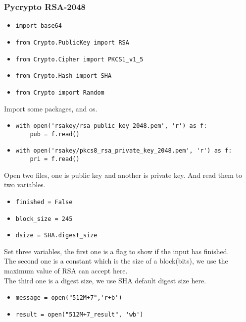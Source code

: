\documentclass{article}
\begin{document}
\subsubsection{Pycrypto RSA-2048}

\begin{itemize}
\item \verb|import base64|
\item \verb|from Crypto.PublicKey import RSA|
\item \verb|from Crypto.Cipher import PKCS1_v1_5|
\item \verb|from Crypto.Hash import SHA|
\item \verb|from Crypto import Random|
\end{itemize}

\noindent Import some packages, and os.

\begin{itemize}
\item \begin{verbatim}with open('rsakey/rsa_public_key_2048.pem', 'r') as f:
    pub = f.read()
\end{verbatim}
\item \begin{verbatim}with open('rsakey/pkcs8_rsa_private_key_2048.pem', 'r') as f:
    pri = f.read()
\end{verbatim}
\end{itemize}

\noindent Open two files, one is public key and another is private key. And read them to two variables.

\begin{itemize}
\item \verb|finished = False|
\item \verb|block_size = 245|
\item \verb|dsize = SHA.digest_size|
\end{itemize}

\noindent Set three variables, the first one is a flag to show if the input has finished.\\
The second one is a constant which is the size of a block(bits), we use the maximum value of RSA can accept here.\\
The third one is a digest size, we use SHA default digest size here.

\begin{itemize}
\item \verb|message = open("512M+7",'r+b')|
\item \verb|result = open("512M+7_result", 'wb')|
\end{itemize}
 
\end{document}
